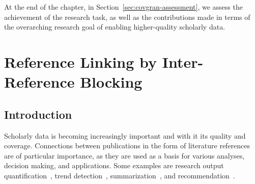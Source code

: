 At the end of the chapter, in Section~\ref{sec:covgran-assessment}, we assess the achievement of the research task, as well as the contributions made in terms of the overarching research goal of enabling higher-quality scholarly data.


\section{Reference Linking by Inter-Reference Blocking}\label{sec:covgran-blocking}

\subsection{Introduction}
Scholarly data is becoming increasingly important and with it its quality and coverage. Connections between publications in the form of literature references are of particular importance, as they are used as a basis for various analyses, decision making, and applications. Some examples are research output quantification~\cite{Hirsch2005}, trend detection~\cite{Chen2006}, summarization~\cite{Elkiss2008}, and recommendation~\cite{Ma2020,Faerber2020a}.

